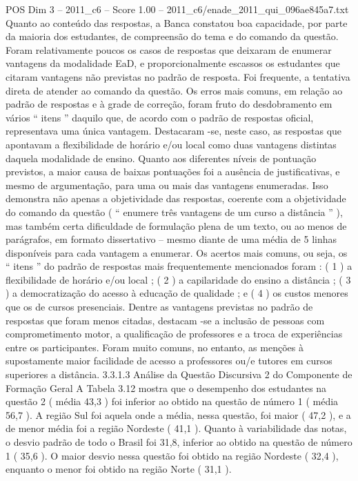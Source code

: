 \begin{textsample}{POS Dim 3 – 2011\_c6 – Score 1.00 – 2011\_c6/enade\_2011\_qui\_096ae845a7.txt}
Quanto ao conteúdo das respostas, a Banca constatou boa capacidade, por parte da maioria dos estudantes, de compreensão do tema e do comando da questão.
Foram relativamente poucos os casos de respostas que deixaram de enumerar vantagens da modalidade EaD, e proporcionalmente escassos os estudantes que citaram vantagens não previstas no padrão de resposta.
Foi frequente, a tentativa direta de atender ao comando da questão.
Os erros mais comuns, em relação ao padrão de respostas e à grade de correção, foram fruto do desdobramento em vários “ itens ” daquilo que, de acordo com o padrão de respostas oficial, representava uma única vantagem.
Destacaram -se, neste caso, as respostas que apontavam a flexibilidade de horário e/ou local como duas vantagens distintas daquela modalidade de ensino.
Quanto aos diferentes níveis de pontuação previstos, a maior causa de baixas pontuações foi a ausência de justificativas, e mesmo de argumentação, para uma ou mais das vantagens enumeradas.
Isso demonstra não apenas a objetividade das respostas, coerente com a objetividade do comando da questão ( “ enumere três vantagens de um curso a distância ” ), mas também certa dificuldade de formulação plena de um texto, ou ao menos de parágrafos, em formato dissertativo – mesmo diante de uma média de 5 linhas disponíveis para cada vantagem a enumerar.
Os acertos mais comuns, ou seja, os “ itens ” do padrão de respostas mais frequentemente mencionados foram : ( 1 ) a flexibilidade de horário e/ou local ; ( 2 ) a capilaridade do ensino a distância ; ( 3 ) a democratização do acesso à educação de qualidade ; e ( 4 ) os custos menores que os de cursos presenciais.
Dentre as vantagens previstas no padrão de respostas que foram menos citadas, destacam -se a inclusão de pessoas com comprometimento motor, a qualificação de professores e a troca de experiências entre os participantes.
Foram muito comuns, no entanto, as menções à supostamente maior facilidade de acesso a professores ou/e tutores em cursos superiores a distância. 3.3.1.3 Análise da Questão Discursiva 2 do Componente de Formação Geral A Tabela 3.12 mostra que o desempenho dos estudantes na questão 2 ( média 43,3 ) foi inferior ao obtido na questão de número 1 ( média 56,7 ).
A região Sul foi aquela onde a média, nessa questão, foi maior ( 47,2 ), e a de menor média foi a região Nordeste ( 41,1 ).
Quanto à variabilidade das notas, o desvio padrão de todo o Brasil foi 31,8, inferior ao obtido na questão de número 1 ( 35,6 ).
O maior desvio nessa questão foi obtido na região Nordeste ( 32,4 ), enquanto o menor foi obtido na região Norte ( 31,1 ).

\end{textsample}
